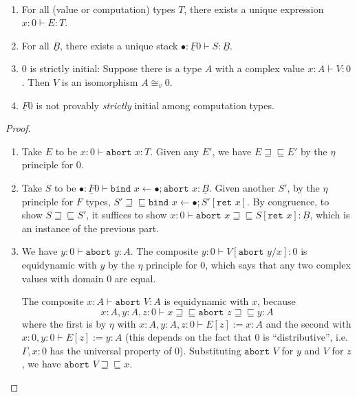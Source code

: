 \documentclass[acmsmall,screen,12pt]{acmart}
\renewcommand{\u}{\underline}
\newcommand{\ltdyn}{\sqsubseteq}
\newcommand{\gtdyn}{\sqsupseteq}
\newcommand{\equidyn}{\mathrel{\gtdyn\ltdyn}}
\newcommand{\bindXtoYinZ}[2]{\kw{bind}#2 \leftarrow #1;}
\newcommand{\kw}[1]{\texttt{#1}\,\,}
\newcommand{\ret}{\kw{ret}}
\newcommand{\abort}{\kw {abort}}
\begin{document}
\begin{longonly}
\begin{lemma} ~ \label{lem:initial}
  \begin{enumerate}
  \item For all (value or computation) types $T$, there exists a unique
    expression $x : 0 \vdash E : T$.
  \item For all $\u B$, there exists a unique stack $\bullet : \u F 0
    \vdash S : \u B$.
  \item
    0 is strictly initial: Suppose there is a type $A$ with a complex
    value $x : A \vdash V : 0$.  Then $V$ is an isomorphism $A \cong_v
    0$.

  \item $\u F 0$ is not provably \emph{strictly} initial among computation types.
  \end{enumerate}
\end{lemma}
\begin{proof}~
    \begin{enumerate}
    \item Take $E$ to be $x : 0 \vdash \abort{x} : T$.  Given any $E'$,
      we have $E \equidyn E'$ by the $\eta$ principle for $0$.

    \item Take $S$ to be $\bullet : \u F 0 \vdash
      \bindXtoYinZ{\bullet}{x}{\abort{x}} : \u B$.  Given another $S'$,
      by the $\eta$ principle for $F$ types, $S' \equidyn
      \bindXtoYinZ{\bullet}{x}{S'[\ret x]}$.  By congruence, to show $S
      \equidyn S'$, it suffices to show $x : 0 \vdash \abort{x} \equidyn
      S[\ret{x}] : \u B$, which is an instance of the previous part.
      
    \item 
      We have $y : 0 \vdash \abort{y} : A$.  The composite $y : 0 \vdash
      V[\abort{y}/x] : 0$ is equidynamic with $y$ by the $\eta$
      principle for $0$, which says that any two complex values with
      domain $0$ are equal.
  
      The composite $x : A \vdash \abort{V} : A$ is equidynamic
      with $x$, because 
  \[
  x : A, y : A, z : 0 \vdash x \equidyn \abort{z} \equidyn y : A
  \]
  where the first is by $\eta$ with $x : A, y : A, z : 0 \vdash E[z] :=
  x : A$ and the second with $x : 0, y : 0 \vdash E[z] := y : A$ (this
  depends on the fact that $0$ is ``distributive'', i.e. $\Gamma,x:0$
  has the universal property of $0$).  Substituting $\abort{V}$ for $y$
  and $V$ for $z$, we have $\abort{V} \equidyn x$.


\end{enumerate}
\end{proof}
\end{longonly}
\end{document}
